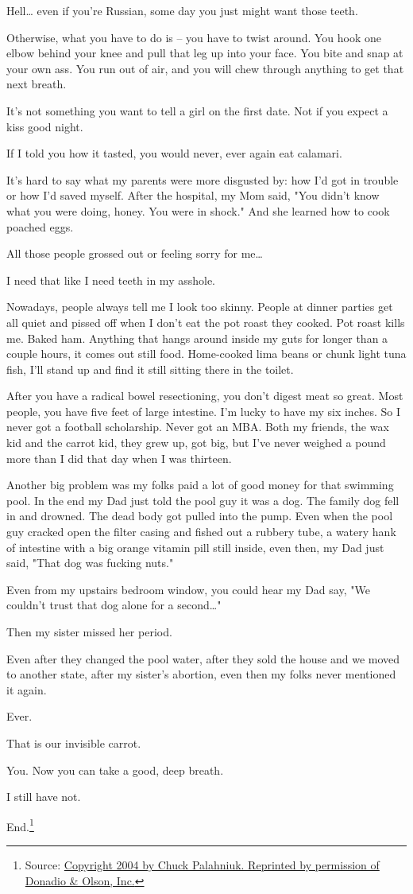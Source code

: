 \documentclass[10pt,a5paper,twoside]{book}
\newcommand{\source}[1]{\footnote{Source: \href{#1}{#1}}}
\begin{document}
Hell… even if you're Russian, some day you just might want those teeth.

Otherwise, what you have to do is -- you have to twist around. You hook one elbow behind your knee and pull that leg up into your face. You bite and snap at your own ass. You run out of air, and you will chew through anything to get that next breath.

It's not something you want to tell a girl on the first date. Not if you expect a kiss good night.

If I told you how it tasted, you would never, ever again eat calamari.

It's hard to say what my parents were more disgusted by: how I'd got in trouble or how I'd saved myself. After the hospital, my Mom said, "You didn't know what you were doing, honey. You were in shock." And she learned how to cook poached eggs.

All those people grossed out or feeling sorry for me…

I need that like I need teeth in my asshole.

Nowadays, people always tell me I look too skinny. People at dinner parties get all quiet and pissed off when I don't eat the pot roast they cooked. Pot roast kills me. Baked ham. Anything that hangs around inside my guts for longer than a couple hours, it comes out still food. Home-cooked lima beans or chunk light tuna fish, I'll stand up and find it still sitting there in the toilet.

After you have a radical bowel resectioning, you don't digest meat so great. Most people, you have five feet of large intestine. I'm lucky to have my six inches. So I never got a football scholarship. Never got an MBA. Both my friends, the wax kid and the carrot kid, they grew up, got big, but I've never weighed a pound more than I did that day when I was thirteen.

Another big problem was my folks paid a lot of good money for that swimming pool. In the end my Dad just told the pool guy it was a dog. The family dog fell in and drowned. The dead body got pulled into the pump. Even when the pool guy cracked open the filter casing and fished out a rubbery tube, a watery hank of intestine with a big orange vitamin pill still inside, even then, my Dad just said, "That dog was fucking nuts."

Even from my upstairs bedroom window, you could hear my Dad say, "We couldn't trust that dog alone for a second…"

Then my sister missed her period.

Even after they changed the pool water, after they sold the house and we moved to another state, after my sister's abortion, even then my folks never mentioned it again.

Ever.

That is our invisible carrot.

You. Now you can take a good, deep breath.

I still have not.

End.\source{Copyright 2004 by Chuck Palahniuk. Reprinted by permission of Donadio \& Olson, Inc.}{}
\end{document}
